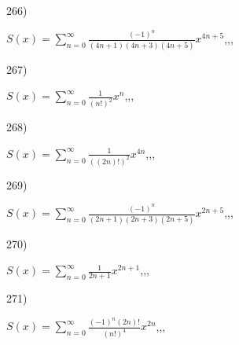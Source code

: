 \documentclass[11pt, ukrainian]{article}
\begin{document}
\par
\vspace{0.9cm}
266) \space 
{%
{$S(x)=\sum\limits_{n=0}^{\infty}{\frac{(-1)^n}{(4n+1)(4n+3)(4n+5)}}{x^{{4n+5}}}$},,, \par \smallskip  
}
\par
\vspace{0.9cm}
267) \space 
{%
{$S(x)=\sum\limits_{n=0}^{\infty}{\frac{1}{(n!)^2}}{x^{{n}}}$},,, \par \smallskip  
}
\par
\vspace{0.9cm}
268) \space 
{%
{$S(x)=\sum\limits_{n=0}^{\infty}{\frac{1}{((2n)!)^2}}{x^{{4n}}}$},,, \par \smallskip  
}
\par
\vspace{0.9cm}
269) \space 
{%
{$S(x)=\sum\limits_{n=0}^{\infty}{\frac{(-1)^n}{(2n+1)(2n+3)(2n+5)}}{x^{{2n+5}}}$},,, \par \smallskip  
}
\par
\vspace{0.9cm}
270) \space 
{%
{$S(x)=\sum\limits_{n=0}^{\infty}{\frac{1}{2n+1}}{x^{{2n+1}}}$},,, \par \smallskip  
}
\par
\newpage
271) \space 
{%
{$S(x)=\sum\limits_{n=0}^{\infty}{\frac{{(-1)^n}(2n)!}{(n!)^4}}{x^{{2n}}}$},,, \par \smallskip  
}
\end{document}
